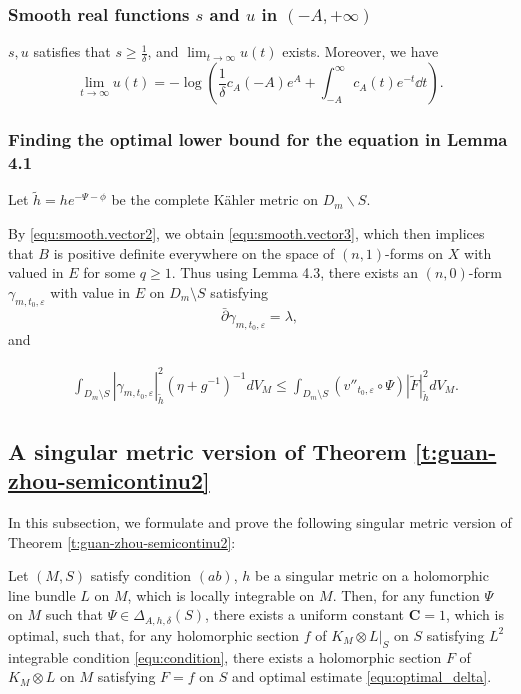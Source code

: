 \subsubsection{Smooth real functions \texorpdfstring{$s$}{} and \texorpdfstring{$u$}{} in \texorpdfstring{$(-A,+\infty)$}{}}
$s,u$ satisfies that $s\geqslant \frac{1}{\delta}$, and $\lim_{t\to\infty} u(t)$ exists. Moreover, we have
\[
  \lim_{t\to\infty} u(t)=-\log(\frac{1}{\delta}c_{A}(-A)e^{A}+\int_{-A}^{\infty}c_{A}(t)e^{-t}\dd t).
\]

\subsubsection{Finding the optimal lower bound for the equation in Lemma 4.1}

Let $\tilde{h}=he^{-\Psi-\phi}$ be the complete K\"ahler metric on $D_m\backslash S$.

By \eqref{equ:smooth.vector2}, we obtain \eqref{equ:smooth.vector3}, which then implices that $B$ is positive definite everywhere on the space of $(n,1)$-forms on $X$  with valued in $E$ for some $q\geqslant 1$. Thus using Lemma 4.3, there exists an $(n,0)$-form
$\gamma_{m,t_0,\varepsilon}$ with value in $E$ on $D_{m}\setminus S$
satisfying
$$\bar{\partial}\gamma_{m,t_0,\varepsilon}=\lambda,$$
and

\begin{equation*}
 \begin{split}
 &\int_{ D_m\setminus S}|\gamma_{m,t_0,\varepsilon}|^{2}_{\tilde{h}}(\eta+g^{-1})^{-1}dV_{M}
  \leq\int_{D_m\setminus S}(v''_{t_0,\varepsilon}\circ{\Psi})| \tilde{F}|^2_{\tilde{h}}dV_M.
  \end{split}
\end{equation*}












\subsection{A singular metric version of Theorem \ref{t:guan-zhou-semicontinu2}}

In this subsection, we formulate and prove the following singular
metric version of Theorem \ref{t:guan-zhou-semicontinu2}:

\begin{thm}\label{t:guan-zhou-semicontinu}
Let $(M,S)$ satisfy condition $(ab)$, $h$ be a singular metric on a
holomorphic line bundle $L$ on $M$, which is locally integrable on
$M$. Then, for any function $\Psi$ on $ M$ such that $\Psi\in
\Delta_{A,h,\delta}(S)$, there exists a uniform constant
$\mathbf{C}=1$, which is optimal, such that, for any holomorphic
section $f$ of $K_{M}\otimes L|_{S}$ on $S$ satisfying $L^2$
integrable condition \ref{equ:condition}, there exists a holomorphic
section $F$ of $K_{M}\otimes L$ on $M$ satisfying $F = f$ on $ S$
and optimal estimate \ref{equ:optimal_delta}.
\end{thm}

